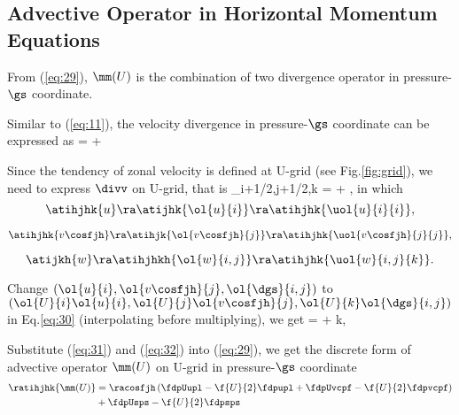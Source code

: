 \subsection{Advective Operator in Horizontal Momentum Equations}\label{app:1}

From (\ref{eq:29}), $\mm(U)$ is the combination of two divergence operator in
pressure-$\gs$ coordinate.

Similar to (\ref{eq:11}), the velocity divergence in pressure-$\gs$ coordinate
can be expressed as
\beeq \label{eq:31}
\divv = \racosf {} + \fp{\dgs}{\gs}
\eneq

Since the tendency of zonal velocity is defined at U-grid (see
Fig.\ref{fig:grid}), we need to express $\divv$ on U-grid, that is
\beeq \label{eq:30}
\grpp{\divv}_{i+1/2,j+1/2,k} = \racosfjh {} + ,
\eneq
in which 
\[ 
\atihjhk{u} \ra \atijhk{ \ol{u}{i} } \ra \atihjhk{ \uol{u}{i}{i} }, 
\] 

\[ 
  \atihjhk{v\cosfjh} \ra \atihjk{ \ol{v\cosfjh}{j} } \ra 
\atihjhk{ \uol{v\cosfjh}{j}{j} },
\]

\[
  \atijkh{w} \ra \atihjhkh{ \ol{w}{i,j} } \ra \atihjhk{ \uol{w}{i,j}{k} }.
\]

Change $(\ol{u}{i}, \ol{v\cosfjh}{j}, \ol{\dgs}{i,j})$ to
$(\ol{U}{i}\ol{u}{i}, \ol{U}{j}\ol{v\cosfjh}{j}, \ol{U}{k}\ol{\dgs}{i,j})$ in 
Eq.\ref{eq:30} (interpolating before multiplying), we get
\beeq \label{eq:32}
\ratihjhk{ \divUv } = \racosfjh {} + \ul{}{k},
\eneq

Substitute (\ref{eq:31}) and (\ref{eq:32}) into (\ref{eq:29}), we get the
discrete form of advective operator $\mm(U)$ on U-grid in pressure-$\gs$
coordinate
\begin{align}
  \ratihjhk{\mm(U)} &= \racosfjh \left( \fdpUupl - \f{U}{2}\fdpupl + 
                    \fdpUvcpf - \f{U}{2}\fdpvcpf \right) \notag\\
                    &+ \fdpUsps - \f{U}{2}\fdpsps
\end{align}
